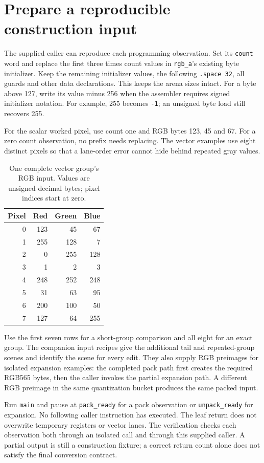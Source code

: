 \section{Prepare a reproducible construction input}\label{rgb-guided-inputs}
The supplied caller can reproduce each programming observation. Set its
\texttt{count} word and replace the first three times count values in
\texttt{rgb\_a}'s existing byte initializer. Keep the remaining initializer values,
the following \texttt{.space 32}, all guards and other data declarations. This keeps
the arena sizes intact. For a byte above 127, write its value minus 256 when the
assembler requires signed initializer notation. For example, 255 becomes
\texttt{-1}; an unsigned byte load still recovers 255.

For the scalar worked pixel, use count one and RGB bytes 123, 45 and 67. For a zero
count observation, no prefix needs replacing. The vector examples use eight distinct
pixels so that a lane-order error cannot hide behind repeated gray values.

\begin{table}[htbp]
  \centering
  \caption{One complete vector group's RGB input. Values are unsigned decimal bytes; pixel indices start at zero.}
  \begin{tabular}{rrrr}
    \toprule
    Pixel & Red & Green & Blue \\
    \midrule
    0     & 123 & 45    & 67   \\
    1     & 255 & 128   & 7    \\
    2     & 0   & 255   & 128  \\
    3     & 1   & 2     & 3    \\
    4     & 248 & 252   & 248  \\
    5     & 31  & 63    & 95   \\
    6     & 200 & 100   & 50   \\
    7     & 127 & 64    & 255  \\
    \bottomrule
  \end{tabular}
\end{table}

Use the first seven rows for a short-group comparison and all eight for an exact
group. The companion input recipes give the additional tail and repeated-group
scenes and identify the scene for every edit. They also supply RGB preimages for
isolated expansion examples: the completed pack path first creates the required
RGB565 bytes, then the caller invokes the partial expansion path. A different RGB
preimage in the same quantization bucket produces the same packed input.

Run \texttt{main} and pause at \texttt{pack\_ready} for a pack observation or
\texttt{unpack\_ready} for expansion. No following caller instruction has executed.
The leaf return does not overwrite temporary registers or vector lanes. The
verification checks each observation both through an isolated call and through this
supplied caller. A partial output is still a construction fixture; a correct return
count alone does not satisfy the final conversion contract.
